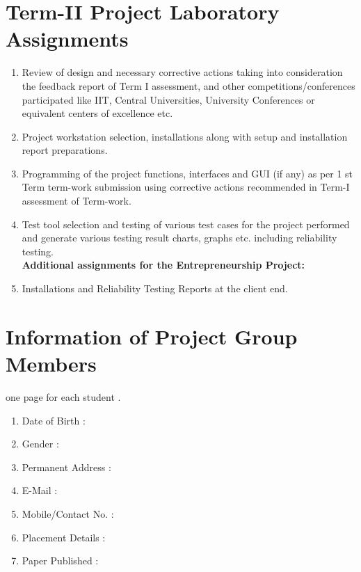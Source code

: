 \documentclass[oneside,a4paper,12pt]{report}
\begin{document}
\begin{normalsize}
\begin{appendices}
\chapter{ Term-II Project Laboratory Assignments}
\begin{enumerate}
\item Review of design and necessary corrective actions taking into consideration the feedback report of Term I assessment, and other competitions/conferences participated like IIT, Central Universities, University Conferences or equivalent centers of excellence etc.
\item Project workstation selection, installations along with setup and installation report preparations.
\item Programming of the project functions, interfaces and GUI (if any) as per 1 st Term term-work submission using corrective actions recommended in Term-I assessment of Term-work.
\item Test tool selection and testing of various test cases for the project performed and generate various testing result charts, graphs etc. including reliability testing.\\
\textbf{Additional assignments for the Entrepreneurship Project:}
\item Installations and Reliability Testing Reports at the client end.

\end{enumerate}
\chapter{Information of Project Group Members}
one page for each student .
\newpage
\begin{enumerate}
\item Date of Birth :
\item Gender : 
\item Permanent Address :
\item E-Mail : 
\item Mobile/Contact No. :
\item Placement Details :
\item Paper Published : 

\end{enumerate}
\end{appendices}
\end{normalsize}
\end{document}

